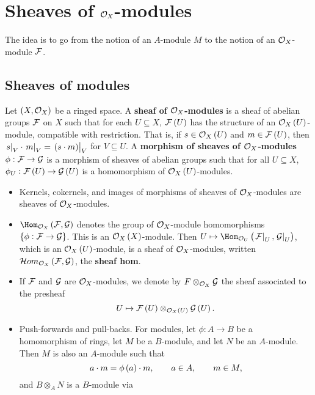 \pagebreak

\section{Sheaves of \texorpdfstring{$ \mathcal{O}_X $-modules}{modules}}

The idea is to go from the notion of an $ A $-module $ M $ to the notion of an $ \mathcal{O}_X $-module $ \mathcal{F} $.

\subsection{Sheaves of modules}

\begin{definition*}
Let $ \br{X, \OOO_X} $ be a ringed space. A \textbf{sheaf of $ \mathcal{O}_X $-modules} is a sheaf of abelian groups $ \mathcal{F} $ on $ X $ such that for each $ U \subseteq X $, $ \FFF\br{U} $ has the structure of an $ \OOO_X\br{U} $-module, compatible with restriction. That is, if $ s \in \OOO_X\br{U} $ and $ m \in \FFF\br{U} $, then $ \eval{s}_V \cdot \eval{m}_V = \eval{\br{s \cdot m}}_V $ for $ V \subseteq U $. A \textbf{morphism of sheaves of $ \mathcal{O}_X $-modules} $ \phi : \mathcal{F} \to \mathcal{G} $ is a morphism of sheaves of abelian groups such that for all $ U \subseteq X $, $ \phi_U : \FFF\br{U} \to \GGG\br{U} $ is a homomorphism of $ \OOO_X\br{U} $-modules.
\begin{itemize}
\item Kernels, cokernels, and images of morphisms of sheaves of $ \mathcal{O}_X $-modules are sheaves of $ \mathcal{O}_X $-modules.
\item $ \Hom_{\OOO_X}\br{\FFF, \GGG} $ denotes the group of $ \mathcal{O}_X $-module homomorphisms $ \cbr{\phi : \FFF \to \GGG} $. This is an $ \OOO_X\br{X} $-module. Then $ U \mapsto \Hom_{\OOO_U}\br{\eval{\FFF}_U, \eval{\GGG}_U} $, which is an $ \OOO_X\br{U} $-module, is a sheaf of $ \mathcal{O}_X $-modules, written $ \HOM_{\OOO_X}\br{\FFF, \GGG} $, the \textbf{sheaf hom}.
\item If $ \mathcal{F} $ and $ \mathcal{G} $ are $ \mathcal{O}_X $-modules, we denote by $ F \otimes_{\mathcal{O}_X} \mathcal{G} $ the sheaf associated to the presheaf
$$ U \mapsto \FFF\br{U} \otimes_{\OOO_X\br{U}} \GGG\br{U}. $$
\item Push-forwards and pull-backs. For modules, let $ \phi : A \to B $ be a homomorphism of rings, let $ M $ be a $ B $-module, and let $ N $ be an $ A $-module. Then $ M $ is also an $ A $-module such that
$$ a \cdot m = \phi\br{a} \cdot m, \qquad a \in A, \qquad m \in M, $$
and $ B \otimes_A N $ is a $ B $-module via

\end{itemize}
\end{definition*}
